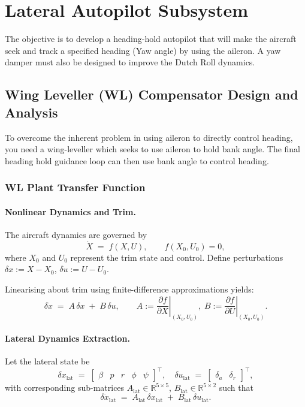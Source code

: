 \section{Lateral Autopilot Subsystem}

The objective is to develop a heading-hold autopilot that will make the aircraft seek and
track a specified heading (Yaw angle) by using the aileron. A yaw damper must also be
designed to improve the Dutch Roll dynamics.

\subsection{Wing Leveller (WL) Compensator Design and Analysis}

To overcome the inherent problem in using aileron to directly control heading, you need a wing-leveller which seeks to use aileron to hold bank angle. The final heading hold guidance loop can then use bank angle to control heading.

\subsubsection{WL Plant Transfer Function}

\paragraph{Nonlinear Dynamics and Trim.}
The aircraft dynamics are governed by
\begin{equation}
\dot{X} \;=\; f(X,U), \qquad f(X_0,U_0)=0,
\end{equation}
where $X_0$ and $U_0$ represent the trim state and control. Define perturbations \(\delta x := X - X_0\), \(\delta u := U - U_0\).

Linearising about trim using finite-difference approximations yields:
\begin{equation}
\delta \dot{x} \;=\; A\,\delta x \;+\; B\,\delta u,
\qquad
A := \left.\frac{\partial f}{\partial X}\right|_{(X_0,U_0)},\;
B := \left.\frac{\partial f}{\partial U}\right|_{(X_0,U_0)}.
\end{equation}

\paragraph{Lateral Dynamics Extraction.}
Let the lateral state be
\begin{equation}
\delta x_{\mathrm{lat}} \;=\; \begin{bmatrix} \beta & p & r & \phi & \psi \end{bmatrix}^{\!\top},
\quad
\delta u_{\mathrm{lat}} \;=\; \begin{bmatrix} \delta_a & \delta_r \end{bmatrix}^{\!\top},
\end{equation}
with corresponding sub-matrices \(A_{\mathrm{lat}}\in\mathbb{R}^{5\times 5}\), \(B_{\mathrm{lat}}\in\mathbb{R}^{5\times 2}\) such that
\begin{equation}
\delta \dot{x}_{\mathrm{lat}} \;=\; A_{\mathrm{lat}}\,\delta x_{\mathrm{lat}} \;+\; B_{\mathrm{lat}}\,\delta u_{\mathrm{lat}}.
\end{equation}

